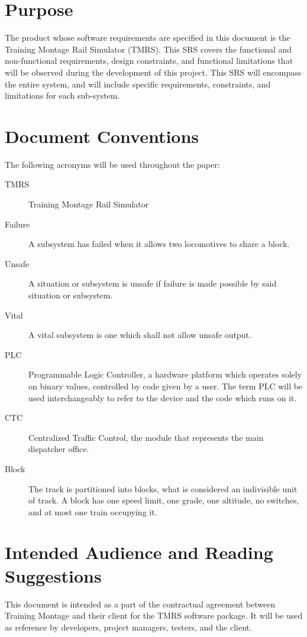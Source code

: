 \documentclass{scrreprt}
\begin{document}
\section{Purpose}
The product whose software requirements are specified in this document is the
Training Montage Rail Simulator (TMRS). This SRS covers the functional and
non-functional requirements, design constraints, and functional limitations that
will be observed during the development of this project. This SRS will encompass
the entire system, and will include specific requirements, constraints, and
limitations for each sub-system.

\section{Document Conventions}
The following acronyms will be used throughout the paper:

\begin{description}
  \item[TMRS] Training Montage Rail Simulator
  \item[Failure] A subsystem has failed when it allows two locomotives to share a block.
  \item[Unsafe] A situation or subsystem is unsafe if failure is made possible by said situation or subsystem.
  \item[Vital] A vital subsystem is one which shall not allow unsafe output.
  \item[PLC] Programmable Logic Controller, a hardware platform which operates solely on binary values, controlled by code given by a user. The term PLC will be used interchangeably to refer to the device and the code which runs on it.
  \item[CTC] Centralized Traffic Control, the module that represents the main dispatcher office.
  \item[Block] The track is partitioned into blocks, what is considered an indivisible unit of track. A block has one speed limit, one grade, one altitude, no switches, and at most one train occupying it.
\end{description}


\section{Intended Audience and Reading Suggestions}
This document is intended as a part of the contractual agreement between Training
Montage and their client for the TMRS software package. It will be used as reference
by developers, project managers, testers, and the client.
\end{document}
